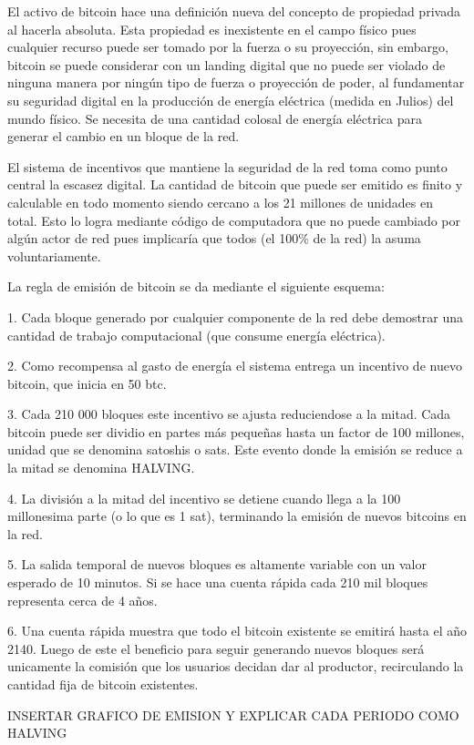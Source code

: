 \documentclass{rbf}
\begin{document}
El activo de bitcoin hace una definición nueva del concepto de propiedad privada al hacerla absoluta. Esta propiedad es inexistente en el campo físico pues cualquier recurso puede ser tomado por la fuerza o su proyección, sin embargo, bitcoin se puede considerar con un landing digital que no puede ser violado de ninguna manera por ningún tipo de fuerza o proyección de poder, al fundamentar su seguridad digital en la producción de energía eléctrica (medida en Julios) del mundo físico. Se necesita de una cantidad colosal de energía eléctrica para generar el cambio en un bloque de la red. 

El sistema de incentivos que mantiene la seguridad de la red toma como punto central la escasez digital. La cantidad de bitcoin que puede ser emitido es finito y calculable en todo momento siendo cercano a los 21 millones de unidades en total. Esto lo logra mediante código de computadora que no puede  cambiado por algún actor de red pues implicaría que todos (el 100\% de la red) la asuma voluntariamente. 

La regla de emisión de bitcoin se da mediante el siguiente esquema:

1. Cada bloque generado por cualquier componente de la red debe demostrar una cantidad de trabajo computacional (que consume energía eléctrica).

2. Como recompensa al gasto de energía el sistema entrega un incentivo de nuevo bitcoin, que inicia en 50 btc.

3. Cada 210 000 bloques este incentivo se ajusta reduciendose a la mitad. Cada bitcoin puede ser dividio en partes más pequeñas hasta un factor de 100 millones, unidad que se denomina satoshis o sats. Este evento donde la emisión se reduce a la mitad se denomina HALVING.

4. La división a la mitad del incentivo se detiene cuando llega a la 100 millonesima parte (o lo que es 1 sat), terminando la emisión de nuevos bitcoins en la red.

5. La salida temporal de nuevos bloques es altamente variable con un valor esperado de 10 minutos. Si se hace una cuenta rápida cada 210 mil bloques representa cerca de 4 años. 

6. Una cuenta rápida muestra que todo el bitcoin existente se emitirá hasta el año 2140. Luego de este el beneficio para seguir generando nuevos bloques será unicamente la comisión que los usuarios decidan dar al productor, recirculando la cantidad fija de bitcoin existentes.


INSERTAR GRAFICO DE EMISION Y EXPLICAR CADA PERIODO COMO HALVING
\end{document}
